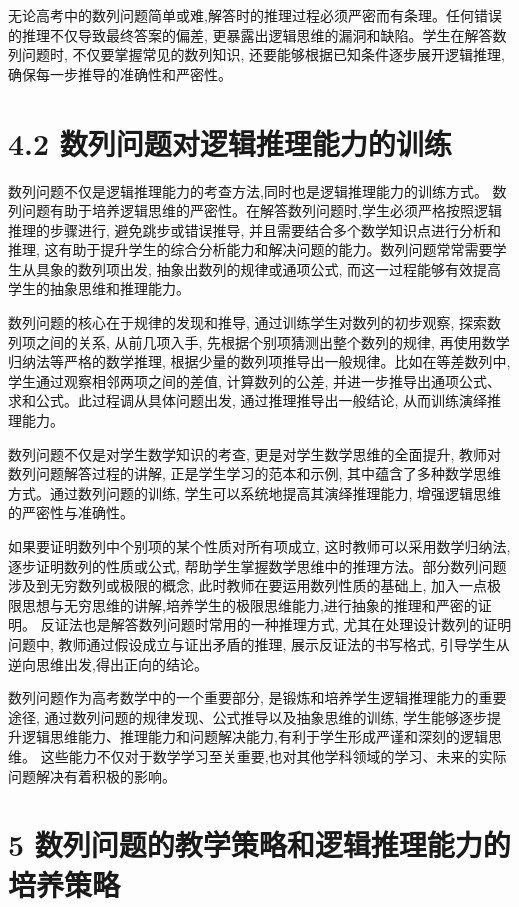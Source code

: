 \documentclass[10pt]{article}
\begin{document}
无论高考中的数列问题简单或难,解答时的推理过程必须严密而有条理。任何错误的推理不仅导致最终答案的偏差, 更暴露出逻辑思维的漏洞和缺陷。学生在解答数列问题时, 不仅要掌握常见的数列知识, 还要能够根据已知条件逐步展开逻辑推理, 确保每一步推导的准确性和严密性。

\section*{4.2 数列问题对逻辑推理能力的训练}

数列问题不仅是逻辑推理能力的考查方法,同时也是逻辑推理能力的训练方式。 数列问题有助于培养逻辑思维的严密性。在解答数列问题时,学生必须严格按照逻辑推理的步骤进行, 避免跳步或错误推导, 并且需要结合多个数学知识点进行分析和推理, 这有助于提升学生的综合分析能力和解决问题的能力。数列问题常常需要学生从具象的数列项出发, 抽象出数列的规律或通项公式, 而这一过程能够有效提高学生的抽象思维和推理能力。

数列问题的核心在于规律的发现和推导, 通过训练学生对数列的初步观察, 探索数列项之间的关系, 从前几项入手, 先根据个别项猜测出整个数列的规律, 再使用数学归纳法等严格的数学推理, 根据少量的数列项推导出一般规律。比如在等差数列中, 学生通过观察相邻两项之间的差值, 计算数列的公差, 并进一步推导出通项公式、求和公式。此过程调从具体问题出发, 通过推理推导出一般结论, 从而训练演绎推理能力。

数列问题不仅是对学生数学知识的考查, 更是对学生数学思维的全面提升, 教师对数列问题解答过程的讲解, 正是学生学习的范本和示例, 其中蕴含了多种数学思维方式。通过数列问题的训练, 学生可以系统地提高其演绎推理能力, 增强逻辑思维的严密性与准确性。

如果要证明数列中个别项的某个性质对所有项成立, 这时教师可以采用数学归纳法, 逐步证明数列的性质或公式, 帮助学生掌握数学思维中的推理方法。部分数列问题涉及到无穷数列或极限的概念, 此时教师在要运用数列性质的基础上, 加入一点极限思想与无穷思维的讲解,培养学生的极限思维能力,进行抽象的推理和严密的证明。 反证法也是解答数列问题时常用的一种推理方式, 尤其在处理设计数列的证明问题中, 教师通过假设成立与证出矛盾的推理, 展示反证法的书写格式, 引导学生从逆向思维出发,得出正向的结论。

数列问题作为高考数学中的一个重要部分, 是锻炼和培养学生逻辑推理能力的重要途径, 通过数列问题的规律发现、公式推导以及抽象思维的训练, 学生能够逐步提升逻辑思维能力、推理能力和问题解决能力,有利于学生形成严谨和深刻的逻辑思维。 这些能力不仅对于数学学习至关重要,也对其他学科领域的学习、未来的实际问题解决有着积极的影响。

\section*{5 数列问题的教学策略和逻辑推理能力的培养策略}
\end{document}
